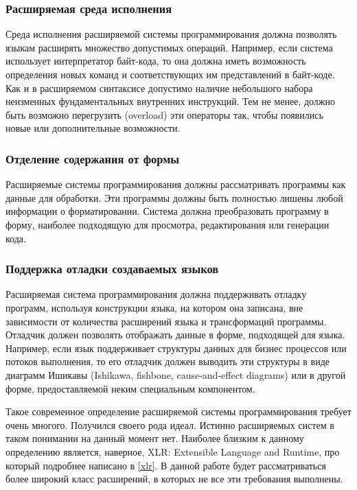 \documentclass[a4paper,12pt,titlepage]{extarticle}
\begin{document}
\subsubsection*{Расширяемая среда исполнения}
Среда исполнения расширяемой системы программирования должна позволять языкам
расширять множество допустимых операций. Например, если система использует
интерпретатор байт-кода, то она должна иметь возможность определения новых
команд и соответствующих им представлений в байт-коде. Как и в расширяемом
синтаксисе допустимо наличие небольшого набора неизменных фундаментальных
внутренних инструкций. Тем не менее, должно быть возможно перегрузить
(overload) эти операторы так, чтобы появились новые или дополнительные
возможности.

\subsubsection*{Отделение содержания от формы}
Расширяемые системы программирования должны рассматривать программы как данные
для обработки. Эти программы должны быть полностью лишены любой информации о
форматировании. Система должна преобразовать программу в форму, наиболее
подходящую для просмотра, редактирования или генерации кода.

\subsubsection*{Поддержка отладки создаваемых языков}
Расширяемая система программирования должна поддерживать отладку программ,
используя конструкции языка, на котором она записана, вне зависимости от
количества расширений языка и трансформаций программы. Отладчик должен
позволять отображать данные в форме, подходящей для языка. Например, если язык
поддерживает структуры данных для бизнес процессов или потоков выполнения, то
его отладчик должен выводить эти структуры в виде диаграмм Ишикавы
\cite{ishikawa} (Ishikawa, fishbone, cause-and-effect diagrams) или в другой
форме, предоставляемой неким специальным компонентом.

Такое современное определение расширяемой системы программирования требует
очень многого. Получился своего рода идеал. Истинно расширяемых систем в таком
понимании на данный момент нет. Наиболее близким к данному определению
является, наверное, XLR: Extensible Language and Runtime, про который подробнее
написано в \ref{xlr}. В данной работе будет рассматриваться более
широкий класс расширений, в которых не все эти требования выполнены.
\end{document}
